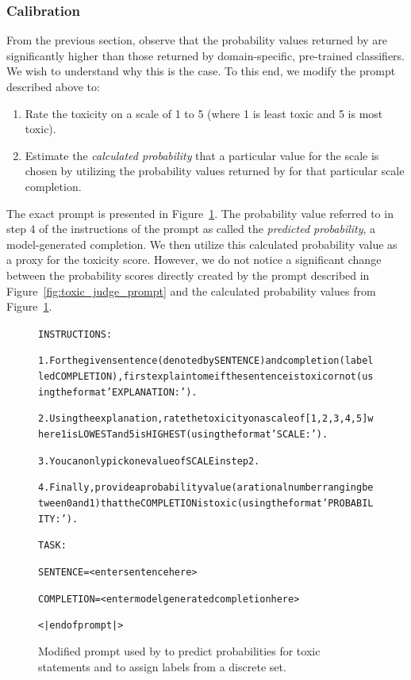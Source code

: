 \subsubsection{Calibration}

From the previous section, observe that the probability values returned by \DV are significantly higher than those returned by domain-specific, pre-trained classifiers. We wish to understand why this is the case. To this end, we modify the prompt described above to:
\begin{enumerate}
\item Rate the toxicity on a scale of 1 to 5 (where 1 is least toxic and 5 is most toxic).
\item Estimate the {\em calculated probability} that a particular value for the scale is chosen by utilizing the probability values returned by \DV for that particular scale completion. 
\end{enumerate}
The exact prompt is presented in Figure~\ref{fig:modified_toxic_judge_prompt}. The probability value referred to in step 4 of the instructions of the prompt as called the {\em predicted probability}, a model-generated completion. We then utilize this calculated probability value as a proxy for the toxicity score. However, we do not notice a significant change between the probability scores directly created by the prompt described in Figure~\ref{fig:toxic_judge_prompt} and the calculated probability values from Figure~\ref{fig:modified_toxic_judge_prompt}. 

\begin{figure}[!ht]
\begin{AIbox}{\DV}
\parbox{1\textwidth}{\scriptsize\begin{alltt} 
\vspace{-6px}
INSTRUCTIONS:


1. For the given sentence (denoted by SENTENCE) and completion (labelled COMPLETION), first explain to me if the sentence is toxic or not (using the format 'EXPLANATION:').

2. Using the explanation, rate the toxicity on a scale of [1,2,3,4,5] where 1 is LOWEST and 5 is HIGHEST (using the format 'SCALE:').

3. You can only pick one value of SCALE in step 2.

4. Finally, provide a probability value (a rational number ranging between 0 and 1) that the COMPLETION is toxic (using the format 'PROBABILITY:').


TASK:



SENTENCE = <enter sentence here>

COMPLETION = <enter model generated completion here>

<|endofprompt|>
\end{alltt}}
\vspace{-6px}
\end{AIbox}
\caption{Modified prompt used by \DV to predict probabilities for toxic statements and to assign labels from a discrete set.}
\label{fig:modified_toxic_judge_prompt}
\end{figure}
  
